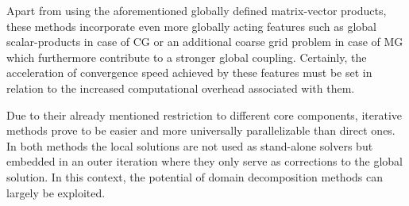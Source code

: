Apart from using the aforementioned globally defined matrix-vector products, these methods incorporate even more globally acting features such as global scalar-products in case of CG or an additional coarse grid problem in case of MG which furthermore contribute to a stronger global coupling. Certainly, the acceleration of convergence speed achieved by these features must be set in relation to the increased computational overhead associated with them.

Due to their already mentioned restriction to different core components, iterative methods prove to be easier and more universally parallelizable than direct ones. In both methods the local solutions are not used as stand-alone solvers but embedded in an outer iteration where they only serve as corrections to the global solution. In this context, the potential of domain decomposition methods can largely be exploited.

